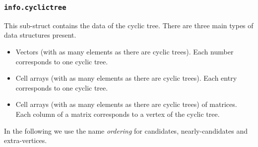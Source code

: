 \subsubsection{\texttt{info.cyclictree}}
This sub-struct contains the data of the cyclic tree. 
There are three main types of data structures present.
\begin{itemize}[noitemsep]
\item Vectors (with as many elements as there are cyclic trees).
Each number corresponds to one cyclic tree.
\item Cell arrays (with as many elements as there are cyclic trees). 
Each entry corresponds to one cyclic tree.
\item Cell arrays (with as many elements as there are cyclic trees) of matrices.
Each column of a matrix corresponds to a vertex of the cyclic tree.
\end{itemize}
In the following we use the name \emph{ordering} for candidates, nearly-candidates and extra-vertices.

